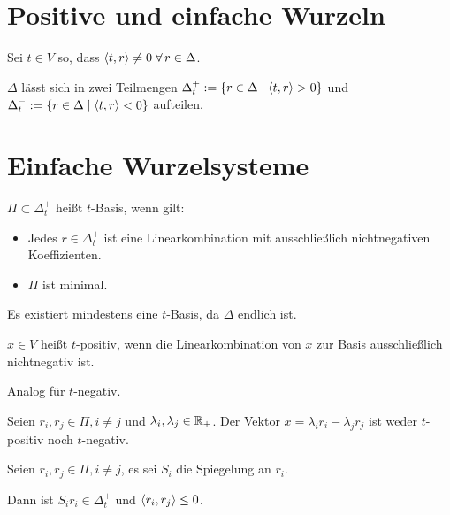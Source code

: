 \documentclass{handout}
\begin{document}
\maketitle
\section{Positive und einfache Wurzeln}
\begin{defi}
    Sei \( t \in V \) so, dass \( \scalarprod{t}{r} \neq 0 
    \; \forall r \in \Delta \).

    \( \Delta \) lässt sich in zwei Teilmengen 
    \( \Delta_t^+ := 
    \{r \in \Delta \;\vert \; \langle t, r \rangle > 0\} \) 
    und \( \Delta_t^- := 
    \{r \in \Delta \;\vert \; \langle t, r \rangle < 0\} \) 
    aufteilen. 
\end{defi}

\section{Einfache Wurzelsysteme}
\begin{defi}[\( t \)-Basis]
    \( \Pi \subset \Delta_t^+ \) heißt \( t \)-Basis, 
    wenn gilt:
    \begin{itemize}
        \item Jedes \( r \in \Delta_t^+ \) ist 
        eine Linearkombination mit ausschließlich 
        nichtnegativen Koeffizienten.
        \item \( \Pi \) ist minimal.
    \end{itemize}
    Es existiert mindestens eine \( t \)-Basis, 
    da \( \Delta \) endlich ist.
\end{defi}

\begin{defi}[\( t \)-positiv]
    \( x \in V \) heißt \(t\)-positiv, wenn 
    die Linearkombination von \(x\) zur 
    Basis ausschließlich nichtnegativ ist.

    Analog für \( t \)-negativ.
\end{defi}

\begin{satz}
    Seien \( r_i, r_j \in \Pi, i \neq j \) und 
    \( \lambda_i, \lambda_j \in \mathbb{R}_+ \). 
    Der Vektor \( x = \lambda_i r_i - \lambda_j r_j \) 
    ist weder \( t \)-positiv noch \( t \)-negativ.
\end{satz}

\begin{satz}
    Seien \( r_i, r_j \in \Pi, i \neq j \), es 
    sei \( S_i \) die Spiegelung an \( r_i \). 

    Dann ist \( S_i r_i \in \Delta_t^+ \) und 
    \( \langle r_i, r_j \rangle \leq 0 \).
\end{satz}
\end{document}
